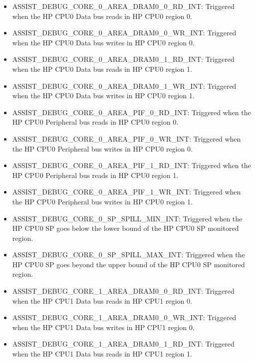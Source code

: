 \documentclass[main\_\_EN.tex]{subfiles}
\begin{document}
\begin{itemize}
\item \label{int:ASSISTDEBUGCORE0AREADRAM00RDINT}ASSIST\_DEBUG\_CORE\_0\_AREA\_DRAM0\_0\_RD\_INT: Triggered when the HP CPU0 Data bus reads in HP CPU0 region 0.
\item \label{int:ASSISTDEBUGCORE0AREADRAM00WRINT}ASSIST\_DEBUG\_CORE\_0\_AREA\_DRAM0\_0\_WR\_INT: Triggered when the HP CPU0 Data bus writes in HP CPU0 region 0.
\item \label{int:ASSISTDEBUGCORE0AREADRAM01RDINT}ASSIST\_DEBUG\_CORE\_0\_AREA\_DRAM0\_1\_RD\_INT: Triggered when the HP CPU0 Data bus reads in HP CPU0 region 1.
\item \label{int:ASSISTDEBUGCORE0AREADRAM01WRINT}ASSIST\_DEBUG\_CORE\_0\_AREA\_DRAM0\_1\_WR\_INT: Triggered when the HP CPU0 Data bus writes in HP CPU0 region 1.
\item \label{int:ASSISTDEBUGCORE0AREAPIF0RDINT}ASSIST\_DEBUG\_CORE\_0\_AREA\_PIF\_0\_RD\_INT: Triggered when the HP CPU0 Peripheral bus reads in HP CPU0 region 0.
\item \label{int:ASSISTDEBUGCORE0AREAPIF0WRINT}ASSIST\_DEBUG\_CORE\_0\_AREA\_PIF\_0\_WR\_INT: Triggered when the HP CPU0 Peripheral bus writes in HP CPU0 region 0.
\item \label{int:ASSISTDEBUGCORE0AREAPIF1RDINT}ASSIST\_DEBUG\_CORE\_0\_AREA\_PIF\_1\_RD\_INT: Triggered when the HP CPU0 Peripheral bus reads in HP CPU0 region 1.
\item \label{int:ASSISTDEBUGCORE0AREAPIF1WRINT}ASSIST\_DEBUG\_CORE\_0\_AREA\_PIF\_1\_WR\_INT: Triggered when the HP CPU0 Peripheral bus writes in HP CPU0 region 1.
\item
\label{int:ASSISTDEBUGCORE0SPSPILLMININT}ASSIST\_DEBUG\_CORE\_0\_SP\_SPILL\_MIN\_INT: Triggered when the HP CPU0 SP goes below the lower bound of the HP CPU0 SP monitored region.
\item
\label{int:ASSISTDEBUGCORE0SPSPILLMAXINT}ASSIST\_DEBUG\_CORE\_0\_SP\_SPILL\_MAX\_INT: Triggered when the HP CPU0 SP goes beyond the upper bound of the HP CPU0 SP monitored region.
\item \label{int:ASSISTDEBUGCORE1AREADRAM00RDINT}ASSIST\_DEBUG\_CORE\_1\_AREA\_DRAM0\_0\_RD\_INT: Triggered when the HP CPU1 Data bus reads in HP CPU1 region 0.
\item \label{int:ASSISTDEBUGCORE1AREADRAM00WRINT}ASSIST\_DEBUG\_CORE\_1\_AREA\_DRAM0\_0\_WR\_INT: Triggered when the HP CPU1 Data bus writes in HP CPU1 region 0.
\item \label{int:ASSISTDEBUGCORE1AREADRAM01RDINT}ASSIST\_DEBUG\_CORE\_1\_AREA\_DRAM0\_1\_RD\_INT: Triggered when the HP CPU1 Data bus reads in HP CPU1 region 1.

\end{itemize}
\end{document}
